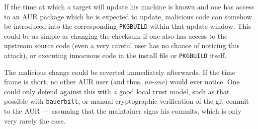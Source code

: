 If the time at which a target will update his machine is known and one has access to an AUR package which he is expected to update, malicious code can somehow be introduced into the corresponding \texttt{PKGBUILD} within that update window.
This could be as simple as changing the checksum if one also has access to the upstream source code (even a very careful user has no chance of noticing this attack), or executing innocuous code in the install file or \texttt{PKGBUILD} itself.

The malicious change could be reverted immediately afterwards. If the time frame is short, no other AUR user (and thus, \emph{no-one}) would ever notice.
One could only defend against this with a good local trust model, such as that possible with \texttt{bauerbill}, or manual cryptographic verification of the git commit to the AUR --- assuming that the maintainer signs his commits, which is only very rarely the case.
